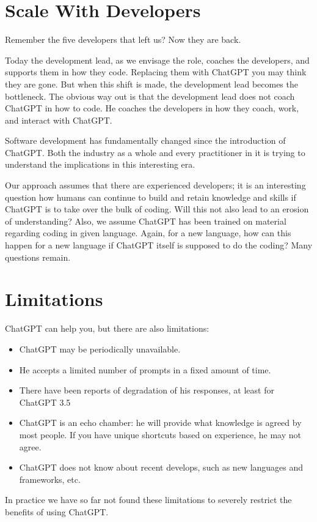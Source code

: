 \documentclass[runningheads]{llncs}
\begin{document}
\section{Scale With Developers}
Remember the five developers that left us? Now they are back.

Today the development lead, as we envisage the role, coaches the developers, and supports them in how they code. Replacing them with ChatGPT you may think they are gone.
But when this shift is made, the development lead becomes the bottleneck. The obvious way out is that the development lead does not coach ChatGPT in how to code. He 
coaches the developers in how they coach, work, and interact with ChatGPT.

Software development has fundamentally changed since the introduction of ChatGPT. Both the industry as a whole and every practitioner in it is trying to understand the implications in this interesting era.

Our approach assumes that there are experienced developers; it is an interesting question how humans can continue to build and retain knowledge and skills if ChatGPT is to take over the bulk of coding. Will this not also lead to an erosion of understanding? Also, we assume ChatGPT has been trained on material regarding coding in given language. Again, for a new language, how can this happen for a new language if ChatGPT itself is supposed to do the coding? Many questions remain.

\section{Limitations}
ChatGPT can help you, but there are also limitations:
\begin{itemize}
    \item ChatGPT may be periodically unavailable.
    \item He accepts a limited number of prompts in a fixed amount of time.
    \item There have been reports of degradation of his responses, at least for ChatGPT 3.5
    \item ChatGPT is an echo chamber: he will provide what knowledge is agreed by most people. If you have unique shortcuts based on experience, he may not agree.
    \item ChatGPT does not know about recent develops, such as new languages and frameworks, etc.
\end{itemize}
In practice we have so far not found these limitations to severely restrict the benefits of using ChatGPT.
\end{document}
